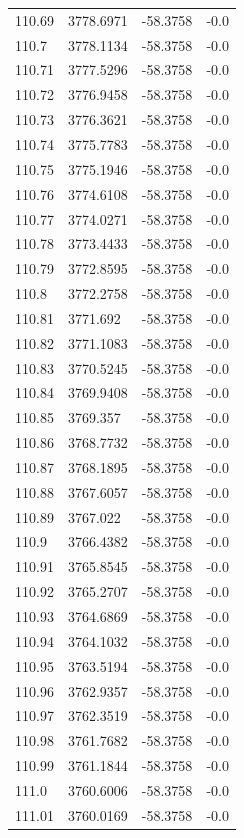 \begin{table}[H]
\begin{tabular}{llll}
110.69 & 3778.6971 & -58.3758 & -0.0 \\
110.7 & 3778.1134 & -58.3758 & -0.0 \\
110.71 & 3777.5296 & -58.3758 & -0.0 \\
110.72 & 3776.9458 & -58.3758 & -0.0 \\
110.73 & 3776.3621 & -58.3758 & -0.0 \\
110.74 & 3775.7783 & -58.3758 & -0.0 \\
110.75 & 3775.1946 & -58.3758 & -0.0 \\
110.76 & 3774.6108 & -58.3758 & -0.0 \\
110.77 & 3774.0271 & -58.3758 & -0.0 \\
110.78 & 3773.4433 & -58.3758 & -0.0 \\
110.79 & 3772.8595 & -58.3758 & -0.0 \\
110.8 & 3772.2758 & -58.3758 & -0.0 \\
110.81 & 3771.692 & -58.3758 & -0.0 \\
110.82 & 3771.1083 & -58.3758 & -0.0 \\
110.83 & 3770.5245 & -58.3758 & -0.0 \\
110.84 & 3769.9408 & -58.3758 & -0.0 \\
110.85 & 3769.357 & -58.3758 & -0.0 \\
110.86 & 3768.7732 & -58.3758 & -0.0 \\
110.87 & 3768.1895 & -58.3758 & -0.0 \\
110.88 & 3767.6057 & -58.3758 & -0.0 \\
110.89 & 3767.022 & -58.3758 & -0.0 \\
110.9 & 3766.4382 & -58.3758 & -0.0 \\
110.91 & 3765.8545 & -58.3758 & -0.0 \\
110.92 & 3765.2707 & -58.3758 & -0.0 \\
110.93 & 3764.6869 & -58.3758 & -0.0 \\
110.94 & 3764.1032 & -58.3758 & -0.0 \\
110.95 & 3763.5194 & -58.3758 & -0.0 \\
110.96 & 3762.9357 & -58.3758 & -0.0 \\
110.97 & 3762.3519 & -58.3758 & -0.0 \\
110.98 & 3761.7682 & -58.3758 & -0.0 \\
110.99 & 3761.1844 & -58.3758 & -0.0 \\
111.0 & 3760.6006 & -58.3758 & -0.0 \\
111.01 & 3760.0169 & -58.3758 & -0.0 \\

\end{tabular}
\end{table}
